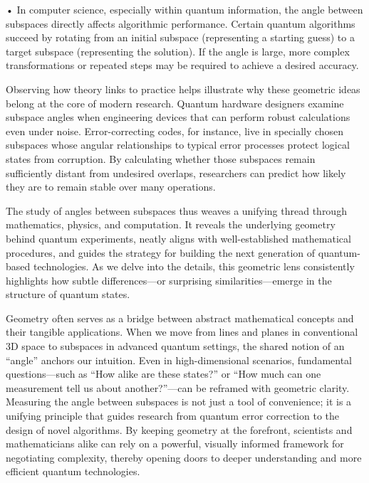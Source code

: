 • In computer science, especially within quantum information, the angle between subspaces directly affects algorithmic performance. Certain quantum algorithms succeed by rotating from an initial subspace (representing a starting guess) to a target subspace (representing the solution). If the angle is large, more complex transformations or repeated steps may be required to achieve a desired accuracy.

Observing how theory links to practice helps illustrate why these geometric ideas belong at the core of modern research. Quantum hardware designers examine subspace angles when engineering devices that can perform robust calculations even under noise. Error-correcting codes, for instance, live in specially chosen subspaces whose angular relationships to typical error processes protect logical states from corruption. By calculating whether those subspaces remain sufficiently distant from undesired overlaps, researchers can predict how likely they are to remain stable over many operations.

The study of angles between subspaces thus weaves a unifying thread through mathematics, physics, and computation. It reveals the underlying geometry behind quantum experiments, neatly aligns with well-established mathematical procedures, and guides the strategy for building the next generation of quantum-based technologies. As we delve into the details, this geometric lens consistently highlights how subtle differences—or surprising similarities—emerge in the structure of quantum states.

\begin{commentary}
Geometry often serves as a bridge between abstract mathematical concepts and their tangible applications. When we move from lines and planes in conventional 3D space to subspaces in advanced quantum settings, the shared notion of an “angle” anchors our intuition. Even in high-dimensional scenarios, fundamental questions—such as “How alike are these states?” or “How much can one measurement tell us about another?”—can be reframed with geometric clarity. Measuring the angle between subspaces is not just a tool of convenience; it is a unifying principle that guides research from quantum error correction to the design of novel algorithms. By keeping geometry at the forefront, scientists and mathematicians alike can rely on a powerful, visually informed framework for negotiating complexity, thereby opening doors to deeper understanding and more efficient quantum technologies.
\end{commentary}